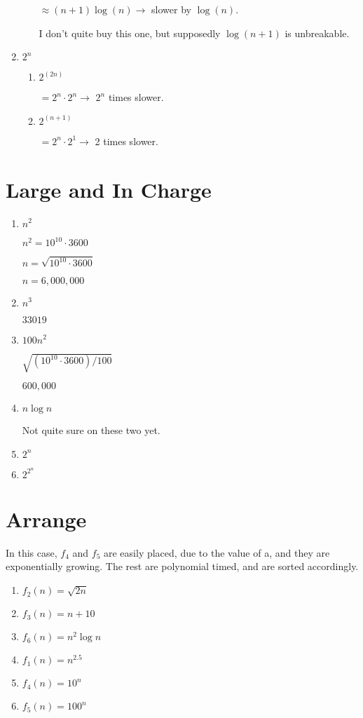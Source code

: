 \documentclass[10pt,reqno,sumlimits]{amsart}
\theoremstyle{plain}
\theoremstyle{definition}
\newcommand{\1}{{\bf 1}}
\numberwithin{equation}{section}
\begin{document}
\begin{enumerate}
\begin{enumerate}
\hspace{0.3in}$\approx (n+1)\log(n) \rightarrow $ slower by $\log(n)$.

I don't quite buy this one, but supposedly $\log(n+1)$ is unbreakable.
\end{enumerate}

\item $2^n$
\begin{enumerate}
\item $2^(2n)$

\hspace{0.3in}$= 2^n \cdot 2^n \rightarrow $ $2^n$ times slower.
\item $2^(n+1)$

\hspace{0.3in}$= 2^n \cdot 2^1 \rightarrow $ 2 times slower.
\end{enumerate}
\end{enumerate}

\section{Large and In Charge}
\begin{enumerate}
\item $n^2$

$ n^2 = 10^{10} \cdot 3600$

$ n = \sqrt{10^{10} \cdot 3600}$

$ n = 6,000,000$

\item $n^3$

$ 33019 $

\item $100n^2$

$ \sqrt{ (10^{10} \cdot 3600) / 100} $

$ 600,000 $

\item $n\log n$

Not quite sure on these two yet.
\item $2^n$

\item $2^{2^n}$
\end{enumerate}

\section{Arrange}
In this case, $f_4$ and $f_5$ are easily placed, due to the value of a, and they are exponentially growing. The rest are polynomial timed, and are sorted accordingly.
\begin{enumerate}
\item $f_2(n) = \sqrt{2n}$
\item $f_3(n) = n + 10$
\item $f_6(n) = n^2\log n$
\item $f_1(n) = n^{2.5}$
\item $f_4(n) = 10^n$
\item $f_5(n) = 100^n$
\end{enumerate}
\end{document}
